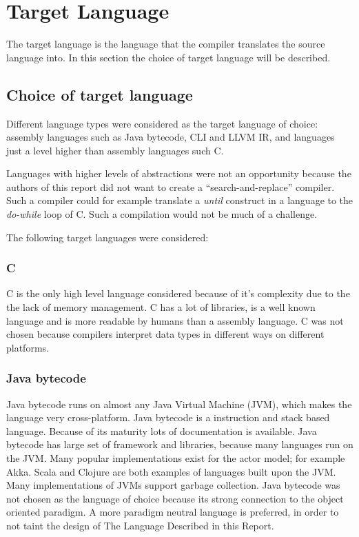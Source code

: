 \section{Target Language}
\label{sec:targetLanguage}

The target language is the language that the compiler translates the source language into. In this section the choice of target language will be described.

\subsection{Choice of target language}

Different language types were considered as the target language of choice: assembly languages such as Java bytecode, CLI and LLVM IR, and languages just a level higher than assembly languages such C.

Languages with higher levels of abstractions were not an opportunity because the authors of this report did not want to create a \enquote{search-and-replace} compiler. Such a compiler could for example translate a \emph{until} construct in a language to the \emph{do-while} loop of C. Such a compilation would not be much of a challenge. 

The following target languages were considered:

\subsubsection{C}
C is the only high level language considered because of it's complexity due to the the lack of memory management. C has a lot of libraries, is a well known language and is more readable by humans than a assembly language. C was not chosen because compilers interpret data types in different ways on different platforms. 

\subsubsection{Java bytecode}
Java bytecode runs on almost any Java Virtual Machine (JVM), which makes the language very cross-platform. Java bytecode is a instruction and stack based language. Because of its maturity lots of documentation is available. Java bytecode has large set of framework and libraries, because many languages run on the JVM. Many popular implementations exist for the actor model; for example Akka. Scala and Clojure are both examples of languages built upon the JVM. Many implementations of JVMs support garbage collection. Java bytecode was not chosen as the language of choice because its strong connection to the object oriented paradigm. A more paradigm neutral language is preferred, in order to not taint the design of The Language Described in this Report.

